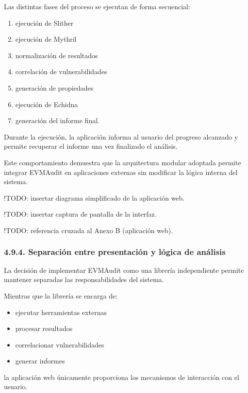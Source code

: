 Las distintas fases del proceso se ejecutan de forma secuencial:

\begin{enumerate}
\def\labelenumi{\arabic{enumi}.}
\tightlist
\item
  ejecución de Slither
\item
  ejecución de Mythril
\item
  normalización de resultados
\item
  correlación de vulnerabilidades
\item
  generación de propiedades
\item
  ejecución de Echidna
\item
  generación del informe final.
\end{enumerate}

Durante la ejecución, la aplicación informa al usuario del progreso
alcanzado y permite recuperar el informe una vez finalizado el análisis.

Este comportamiento demuestra que la arquitectura modular adoptada
permite integrar EVMAudit en aplicaciones externas sin modificar la
lógica interna del sistema.

!TODO: insertar diagrama simplificado de la aplicación web.

!TODO: insertar captura de pantalla de la interfaz.

!TODO: referencia cruzada al Anexo B (aplicación web).

\subsubsection{4.9.4. Separación entre presentación y lógica de
análisis}\label{separaciuxf3n-entre-presentaciuxf3n-y-luxf3gica-de-anuxe1lisis}

La decisión de implementar EVMAudit como una librería independiente
permite mantener separadas las responsabilidades del sistema.

Mientras que la librería se encarga de:

\begin{itemize}
\tightlist
\item
  ejecutar herramientas externas
\item
  procesar resultados
\item
  correlacionar vulnerabilidades
\item
  generar informes
\end{itemize}

la aplicación web únicamente proporciona los mecanismos de interacción
con el usuario.

